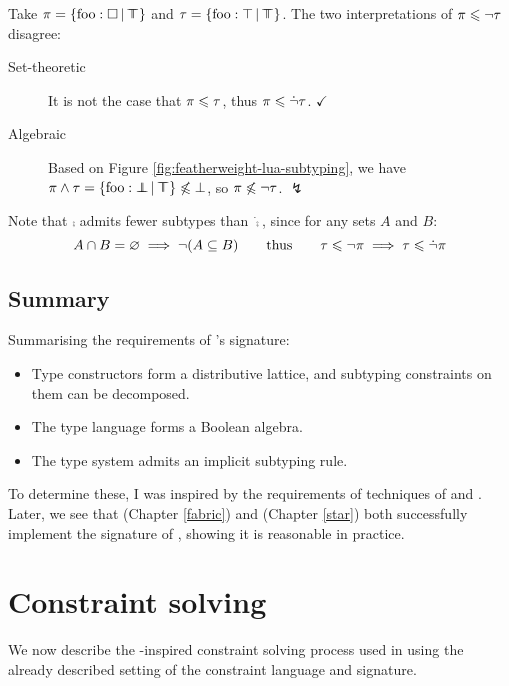 \begin{example}
    Take $\pi = \flext{\mathrm{foo}: \flabsent }{\flftop}$ and $\tau = \flext{\mathrm{foo}: \top}{\flftop}$. The two interpretations of $\pi \leqslant \lnot \tau$ disagree: \begin{description}
        \item[Set-theoretic] It is not the case that $\pi \leqslant \tau$, thus $\pi \leqslant \dot {\lnot} \tau$. $\checkmark$
        \item[Algebraic] Based on Figure \ref{fig:featherweight-lua-subtyping}, we have $\pi \meet \tau = \flext{\mathrm{foo} : \flfbot }{\flftop} \not\sub \bot$, so $\pi \not\leqslant \lnot \tau$. $\lightning$
        \end{description}
    Note that $\comp$ admits fewer subtypes than $\dot \comp$, since for any sets $A$ and $B$: 
    $$A \cap B = \varnothing \implies \lnot(A \subseteq B) \qquad\text{thus}\qquad \tau \leqslant \lnot \pi \implies \tau \leqslant \dot{\lnot} \pi $$ 
\end{example}

\subsection{Summary} Summarising the requirements of \inference{}'s signature: \begin{itemize}
    \item Type constructors form a distributive lattice, and subtyping constraints on them 
    can be decomposed.
    \item The type language forms a Boolean algebra.
    \item The type system admits an implicit subtyping rule.
\end{itemize} 
To determine these, I was inspired by the requirements of techniques of \textcite{mlsub} and \textcite{mlstruct}.
Later, we see that \fabric{} (Chapter \ref{fabric}) and \starr{} (Chapter \ref{star}) both successfully implement the signature of \inference{}, showing it is reasonable in practice.

\section{Constraint solving}
\label{sec:constraints}

We now describe the \mlstruct{}-inspired constraint solving process used in \inference{} using the already described setting of the constraint language and signature. 

